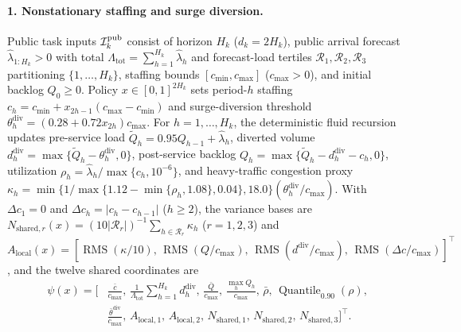 \paragraph{1. Nonstationary staffing and surge diversion.}
Public task inputs $\mathcal{I}_k^{\mathrm{pub}}$ consist of horizon $H_k$ ($d_k = 2 H_k$), public arrival forecast $\hat{\lambda}_{1:H_k} > 0$ with total $\Lambda_{\mathrm{tot}} = \sum_{h=1}^{H_k}\hat{\lambda}_h$ and forecast-load tertiles $\mathcal{R}_1, \mathcal{R}_2, \mathcal{R}_3$ partitioning $\{1,\dots,H_k\}$, staffing bounds $[c_{\min}, c_{\max}]$ ($c_{\max} > 0$), and initial backlog $Q_0 \ge 0$. Policy $x \in [0,1]^{2 H_k}$ sets period-$h$ staffing $c_h = c_{\min} + x_{2h-1}(c_{\max}-c_{\min})$ and surge-diversion threshold $\theta_h^{\mathrm{div}} = (0.28 + 0.72 x_{2h})c_{\max}$. For $h = 1,\dots,H_k$, the deterministic fluid recursion updates pre-service load $\tilde{Q}_h = 0.95 Q_{h-1} + \hat{\lambda}_h$, diverted volume $d_h^{\mathrm{div}} = \max\{\tilde{Q}_h - \theta_h^{\mathrm{div}}, 0\}$, post-service backlog $Q_h = \max\{\tilde{Q}_h - d_h^{\mathrm{div}} - c_h, 0\}$, utilization $\rho_h = \hat{\lambda}_h / \max\{c_h, 10^{-6}\}$, and heavy-traffic congestion proxy $\kappa_h = \min\{1/\max\{1.12 - \min\{\rho_h, 1.08\}, 0.04\}, 18.0\}(\theta_h^{\mathrm{div}}/c_{\max})$. With $\Delta c_1 = 0$ and $\Delta c_h = |c_h - c_{h-1}|$ ($h \ge 2$), the variance bases are $N_{\mathrm{shared},r}(x) = (10|\mathcal{R}_r|)^{-1}\sum_{h \in \mathcal{R}_r} \kappa_h$ ($r=1,2,3$) and $A_{\mathrm{local}}(x) = [\operatorname{RMS}(\kappa/10),\, \operatorname{RMS}(Q/c_{\max}),\, \operatorname{RMS}(d^{\mathrm{div}}/c_{\max}),\, \operatorname{RMS}(\Delta c/c_{\max})]^\top$, and the twelve shared coordinates are
\begin{align*}
  \psi(x) = \Big[&\tfrac{\bar{c}}{c_{\max}},\, \tfrac{1}{\Lambda_{\mathrm{tot}}}\textstyle\sum_{h=1}^{H_k} d_h^{\mathrm{div}},\, \tfrac{\bar{Q}}{c_{\max}},\, \tfrac{\max_h Q_h}{c_{\max}},\, \bar{\rho},\, \operatorname{Quantile}_{0.90}(\rho), \\
  &\tfrac{\bar{\theta}^{\mathrm{div}}}{c_{\max}},\, A_{\mathrm{local},1},\, A_{\mathrm{local},2},\, N_{\mathrm{shared},1},\, N_{\mathrm{shared},2},\, N_{\mathrm{shared},3}\Big]^\top.
\end{align*}

